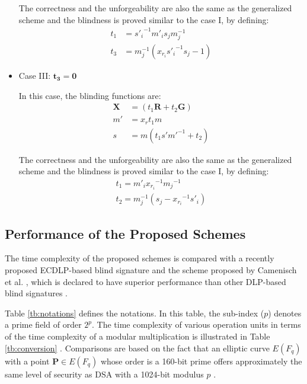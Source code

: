 \documentclass[journal,onecolumn,draftcls]{IEEEtran}
\begin{document}
\begin{itemize}
	The correctness and the unforgeability are also the same as the generalized scheme and the blindness is proved similar to the case I, by defining:
	\begin{align}
		t_1 &= {s'_i}^{-1} m'_i s_j m_j^{-1} \nonumber \\
		t_3 &= m_j^{-1} (x_{r_i} {s'_i}^{-1}s_j-1)
	\end{align}
	
	\item Case III: $\mathbf{t_3=0}$
	
	In this case, the blinding functions are:
	\begin{align}
		\textbf{X} &= (t_1 \textbf{R}+t_2 \textbf{G}) \nonumber \\
		m' &= x_r t_1 m \nonumber \\
		s &=m(t_1 s'm'^{-1}+t_2 )							
	\end{align}
	
	The correctness and the unforgeability are also the same as the generalized scheme and the blindness is proved similar to the case I, by defining: 
	\begin{align}
			t_1=m'_i {x_{r_i}}^{-1} {m_j}^{-1} \nonumber \\
			t_2=m_j^{-1} (s_j-{x_{r_i}}^{-1} s'_i )			
	\end{align}
\end{itemize}

\subsection{Performance of the Proposed Schemes}
The time complexity of the proposed schemes is compared with a recently proposed ECDLP-based blind signature \cite{Nikooghadam} and the scheme proposed by Camenisch et al. \cite{Camenisch}, which is declared to have superior performance than other DLP-based blind signatures \cite{Ting}.

Table \ref{tb:notations} defines the notations. In this table, the sub-index ($p$) denotes a prime field of order $2^p$. The time complexity of various operation units in terms of the time complexity of a modular multiplication is illustrated in Table \ref{tb:conversion} \cite{Chung}. Comparisons are based on the fact that an elliptic curve $E(F_q)$ with a point $\textbf{P}\in E(F_q)$ whose order is a 160-bit prime offers approximately the same level of security as DSA with a 1024-bit modulus $p$ \cite{Koblitz2}.
\end{document}
